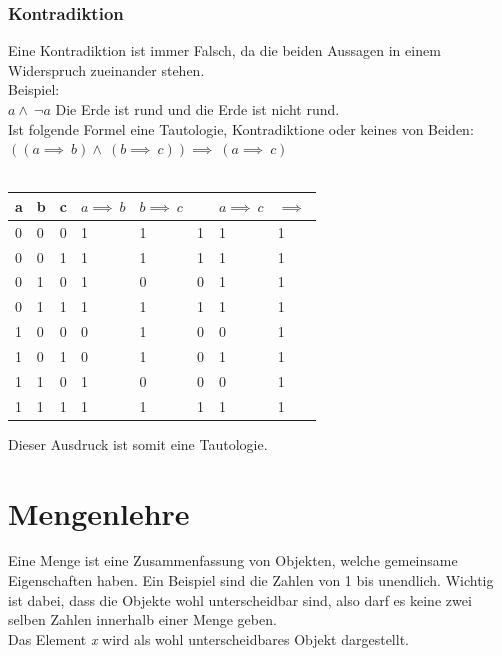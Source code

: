 \documentclass{article}
\begin{document}
	\subsubsection{Kontradiktion}
	Eine Kontradiktion ist immer Falsch, da die beiden Aussagen in einem Widerspruch zueinander stehen. \\
	Beispiel: \\
	$a \land\ \neg a$
	Die Erde ist rund und die Erde ist nicht rund. \\

	Ist folgende Formel eine Tautologie, Kontradiktione oder keines von Beiden: \\
	$((a \implies\ b) \land\ (b \implies\ c)) \implies\ (a \implies\ c)$ \\ \\
	\begin{tabular}{| l | l | l | l | l | l | l | l |}
		\toprule
		a & b & c & $a \implies\ b$ & $ b \implies\ c $ & \lor\ & $a \implies\ c$ & $\implies\ $ \\ \midrule
		0 & 0 & 0 & 1 & 1 & 1 & 1 & 1 \\ \hline
		0 & 0 & 1 & 1 & 1 & 1 & 1 & 1 \\ \hline
		0 & 1 & 0 & 1 & 0 & 0 & 1 & 1 \\ \hline
		0 & 1 & 1 & 1 & 1 & 1 & 1 & 1 \\ \hline
		1 & 0 & 0 & 0 & 1 & 0 & 0 & 1 \\ \hline
		1 & 0 & 1 & 0 & 1 & 0 & 1 & 1 \\ \hline
		1 & 1 & 0 & 1 & 0 & 0 & 0 & 1 \\ \hline
		1 & 1 & 1 & 1 & 1 & 1 & 1 & 1 \\ 
		\bottomrule
	\end{tabular}
	Dieser Ausdruck ist somit eine Tautologie.
	\section{Mengenlehre}
	Eine Menge ist eine Zusammenfassung von Objekten, welche gemeinsame Eigenschaften haben. Ein Beispiel sind die Zahlen von 1 bis unendlich. Wichtig ist dabei, dass die Objekte wohl unterscheidbar sind, also darf es keine zwei selben Zahlen innerhalb einer Menge geben. \\
	Das Element \textit{x} wird als wohl unterscheidbares Objekt dargestellt.
\end{document}
